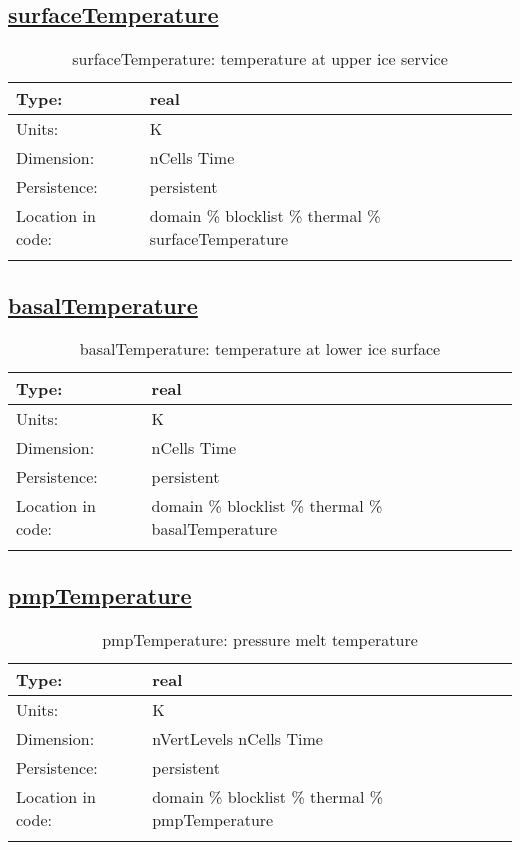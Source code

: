 \subsection[surfaceTemperature]{\hyperref[sec:var_tab_thermal]{surfaceTemperature}}
\label{subsec:var_sec_thermal_surfaceTemperature}
\begin{center}
\begin{longtable}{| p{2.0in} | p{4.0in} |}
        \hline 
        Type: & real \\
        \hline 
        Units: & \si{K} \\
        \hline 
        Dimension: & nCells Time \\
        \hline 
        Persistence: & persistent \\
        \hline 
         Location in code: & domain \% blocklist \% thermal \% surfaceTemperature \\
         \hline 
    \caption{surfaceTemperature: temperature at upper ice service}
\end{longtable}
\end{center}
\subsection[basalTemperature]{\hyperref[sec:var_tab_thermal]{basalTemperature}}
\label{subsec:var_sec_thermal_basalTemperature}
\begin{center}
\begin{longtable}{| p{2.0in} | p{4.0in} |}
        \hline 
        Type: & real \\
        \hline 
        Units: & \si{K} \\
        \hline 
        Dimension: & nCells Time \\
        \hline 
        Persistence: & persistent \\
        \hline 
         Location in code: & domain \% blocklist \% thermal \% basalTemperature \\
         \hline 
    \caption{basalTemperature: temperature at lower ice surface}
\end{longtable}
\end{center}
\subsection[pmpTemperature]{\hyperref[sec:var_tab_thermal]{pmpTemperature}}
\label{subsec:var_sec_thermal_pmpTemperature}
\begin{center}
\begin{longtable}{| p{2.0in} | p{4.0in} |}
        \hline 
        Type: & real \\
        \hline 
        Units: & \si{K} \\
        \hline 
        Dimension: & nVertLevels nCells Time \\
        \hline 
        Persistence: & persistent \\
        \hline 
         Location in code: & domain \% blocklist \% thermal \% pmpTemperature \\
         \hline 
    \caption{pmpTemperature: pressure melt temperature}
\end{longtable}
\end{center}
